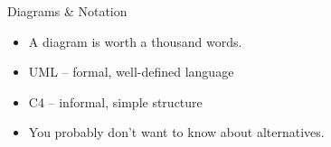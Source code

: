 \documentclass{slide}
\begin{document}
\begin{frame}{Diagrams \& Notation}

\Large{
\begin{itemize}
    \item A  diagram is worth a thousand words.
    \vspace{5mm}
    \item UML -- formal, well-defined language \cite{uml}
    \item C4 -- informal, simple structure \cite{brown2022c4}
    \vspace{2mm}
    \item You probably don't want to know about alternatives.
\end{itemize}
}

\end{frame}




\end{document}
